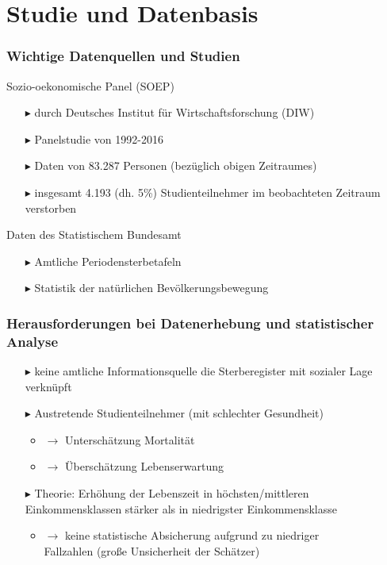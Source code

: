 \documentclass{beamer}
\begin{document}
\section{Studie und Datenbasis}
\begin{frame}
\frametitle{Wichtige Datenquellen und Studien}
  \begin{block}{Sozio-oekonomische Panel (SOEP)}
   \begin{itemize}
     \item [$\blacktriangleright$] durch Deutsches Institut für   Wirtschaftsforschung (DIW)
     \item [$\blacktriangleright$] Panelstudie von 1992-2016
     \item [$\blacktriangleright$] Daten von  83.287 Personen (bezüglich obigen Zeitraumes)
     \item[$\blacktriangleright$] insgesamt 4.193 (dh. 5\%) Studienteilnehmer im beobachteten Zeitraum verstorben
   \end{itemize}
  \end{block}
  \begin{block}{Daten des Statistischem Bundesamt}
   \begin{itemize}
     \item [$\blacktriangleright$] Amtliche Periodensterbetafeln
     \item [$\blacktriangleright$] Statistik der natürlichen Bevölkerungsbewegung
   \end{itemize}
  \end{block}
\end{frame}

\begin{frame}
\frametitle{Herausforderungen bei Datenerhebung und statistischer Analyse}
	\begin{itemize}
		\item [$\blacktriangleright$] keine amtliche Informationsquelle die 	Sterberegister mit sozialer Lage verknüpft
		\item [$\blacktriangleright$] Austretende Studienteilnehmer (mit schlechter Gesundheit)
			\begin{itemize}
				\item $\rightarrow$ Unterschätzung Mortalität
				\item $\rightarrow$ Überschätzung Lebenserwartung
			\end{itemize}
		\item [$\blacktriangleright$]Theorie: Erhöhung der Lebenszeit in höchsten/mittleren Einkommensklassen stärker als in niedrigster Einkommensklasse
		\begin{itemize}
			\item $\rightarrow$ keine statistische Absicherung aufgrund zu niedriger\\
			\hspace{0.4cm} Fallzahlen (große Unsicherheit der Schätzer)
		\end{itemize}
	\end{itemize}
\end{frame}
\end{document}
